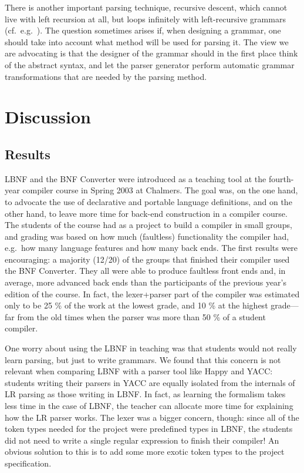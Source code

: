 \documentclass[10pt]{article}
\begin{document}
There is another important parsing technique, recursive descent,
which cannot live with left recursion at all, but loops infinitely
with left-recursive grammars (cf.\ e.g.\ \cite{appel}).
The question sometimes arises if, when designing a grammar,
one should take into account what method will be used for parsing it.
The view we are advocating is that the designer of the grammar
should in the first place think of the abstract syntax, and let
the parser generator perform automatic
grammar transformations that are needed by the parsing method.




\section{Discussion}

\subsection{Results}

\label{results}

LBNF and the BNF Converter\cite{bnfc} were introduced as a teaching tool at the
fourth-year compiler course in Spring 2003 at Chalmers.
The goal was, on the one hand, to advocate the use of declarative
and portable language definitions, and on the other hand, to
leave more time for back-end construction in a compiler course.
The students of the course had as a project to build a compiler in small
groups, and grading was based on how much (faultless) functionality
the compiler had, e.g.\ how many language features and how many back ends.
The first results were
encouraging: a majority (12/20) of the
groups that finished their compiler used the BNF Converter. They all were
able to produce faultless front ends and, in average, more advanced
back ends than the participants of the previous year's edition of the
course. In fact, the lexer+parser part of the compiler was estimated
only to be 25 \% of the work at the lowest grade, and 10 \% at the
highest grade---far from the old times when the parser was more than 50 \% of
a student compiler.

One worry about using the LBNF in teaching was that students would
not really learn parsing, but just to write grammars. We found that this
concern is not relevant when comparing LBNF with a parser tool like Happy and
YACC: students writing their parsers in YACC are equally isolated
from the internals of LR parsing as those writing in LBNF. In fact, as learning
the formalism takes less time in the case of LBNF, the teacher can allocate more
time for explaining how the LR parser works. The lexer was a bigger concern, though:
since all of the token types needed for the project were predefined types in LBNF,
the students did not need to write a single regular expression to finish their
compiler! An obvious solution to this is to add some more exotic token types to the
project specification.
\end{document}
